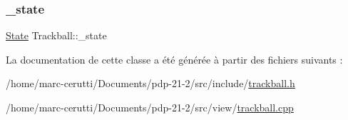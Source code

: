 \mbox{\label{class_trackball_a138a8078de8d43d681e6b377166333a1}} 
\subsubsection{\texorpdfstring{\+\_\+state}{\_state}}
{\footnotesize\ttfamily \hyperlink{class_trackball_a102216413a87cb37801044063a1b05be}{State} Trackball\+::\+\_\+state\hspace{0.3cm}{\ttfamily [private]}}



La documentation de cette classe a été générée à partir des fichiers suivants \+:\begin{DoxyCompactItemize}
\item 
/home/marc-\/cerutti/\+Documents/pdp-\/21-\/2/src/include/\hyperlink{trackball_8h}{trackball.\+h}\item 
/home/marc-\/cerutti/\+Documents/pdp-\/21-\/2/src/view/\hyperlink{trackball_8cpp}{trackball.\+cpp}\end{DoxyCompactItemize}
